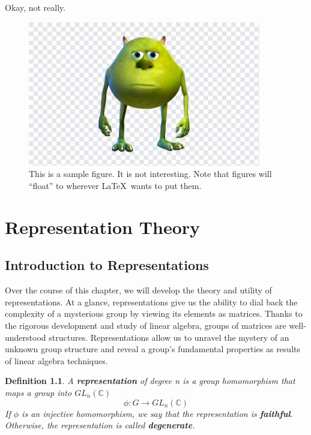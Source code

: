 \documentclass[10pt]{ucthesis}
\newtheorem{definition}{Definition}[chapter]
\begin{document}
Okay, not really.  



\begin{figure}[htbp] %
   \centering
   \includegraphics[width=4in]{meme.jpg} 
   \caption{This is a sample figure.  It is not interesting. Note that 
   figures will ``float'' to wherever \LaTeX \ wants to put them.  }
   \label{fig:example}
\end{figure}


\chapter{Representation Theory}

\section{Introduction to Representations}

Over the course of this chapter, we will develop the theory and utility of representations. At a glance, representations give us the ability to dial back the complexity of a mysterious group by viewing its elements as matrices. Thanks to the rigorous development and study of linear algebra, groups of matrices are well-understood structures. Representations allow us to unravel the mystery of an unknown group structure and reveal a group's fundamental properties as results of linear algebra techniques. 

\begin{definition}
	A \textbf{representation} of degree n is a group homomorphism that maps a group into $GL_n(\mathbb{C})$
	$$\phi:G\rightarrow GL_n(\mathbb{C})$$
	If $\phi$ is an injective homomorphism, we say that the representation is \textbf{faithful}. Otherwise, the representation is called \textbf{degenerate}.
\end{definition}
\end{document}
